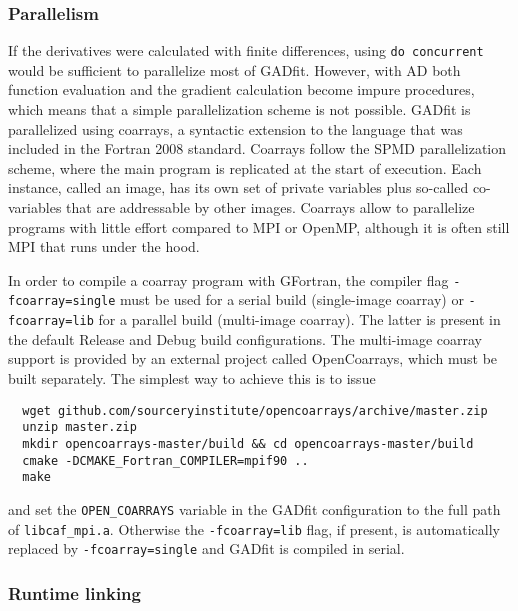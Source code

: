 \documentclass{article}
\begin{document}
\subsubsection{Parallelism}

If the derivatives were calculated with finite differences, using
\texttt{do concurrent} would be sufficient to parallelize most of
GADfit. However, with AD both function evaluation and the gradient
calculation become impure procedures, which means that a simple
parallelization scheme is not possible. GADfit is parallelized using
coarrays, a syntactic extension to the language that was included in
the Fortran 2008 standard. Coarrays follow the SPMD parallelization
scheme, where the main program is replicated at the start of
execution. Each instance, called an image, has its own set of private
variables plus so-called co-variables that are addressable by other
images. Coarrays allow to parallelize programs with little effort
compared to MPI or OpenMP, although it is often still MPI that runs
under the hood.

In order to compile a coarray program with GFortran, the compiler flag
\texttt{-fcoarray=single} must be used for a serial build
(single-image coarray) or \texttt{-fcoarray=lib} for a parallel build
(multi-image coarray). The latter is present in the default Release
and Debug build configurations. The multi-image coarray support is
provided by an external project called OpenCoarrays, which must be
built separately. The simplest way to achieve this is to issue
\begin{verbatim}
  wget github.com/sourceryinstitute/opencoarrays/archive/master.zip
  unzip master.zip
  mkdir opencoarrays-master/build && cd opencoarrays-master/build
  cmake -DCMAKE_Fortran_COMPILER=mpif90 ..
  make
\end{verbatim}
and set the \verb+OPEN_COARRAYS+ variable in the GADfit configuration
to the full path of \verb+libcaf_mpi.a+. Otherwise the
\texttt{-fcoarray=lib} flag, if present, is automatically replaced by
\texttt{-fcoarray=single} and GADfit is compiled in serial.

\subsubsection{\label{sec:runtime}Runtime linking}
\end{document}
